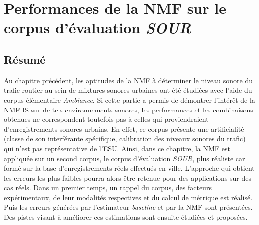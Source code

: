 
\chapter{Performances de la NMF sur le corpus d'évaluation \textit{SOUR}}
\label{chap:grafic}


\section*{\centering Résumé}



\vspace{2cm}

Au chapitre précédent, les aptitudes de la NMF à déterminer le niveau sonore du trafic routier au sein de mixtures sonores urbaines ont été étudiées avec l'aide du corpus élémentaire \textit{Ambiance}. Si cette partie a permis de démontrer l'intérêt de la NMF IS sur de tels environnements sonores, les performances et les combinaisons obtenues ne correspondent toutefois pas à celles qui proviendraient d'enregistrements sonores urbains. En effet, ce corpus présente une artificialité (classe de son interférante spécifique, calibration des niveaux sonores du trafic) qui n'est pas représentative de l'ESU. Ainsi, dans ce chapitre, la NMF est appliquée sur un second corpus, le corpus d'évaluation \textit{SOUR}, plus réaliste car formé sur la base d'enregistrements réels effectués en ville. L'approche qui obtient les erreurs les plus faibles pourra alors être retenue pour des applications sur des cas réels. Dans un premier temps, un rappel du corpus, des facteurs expérimentaux, de leur modalités respectives et du calcul de métrique est réalisé. Puis les erreurs générées par l'estimateur \textit{baseline} et par la NMF sont présentées. Des pistes visant à améliorer ces estimations sont ensuite étudiées et proposées.

